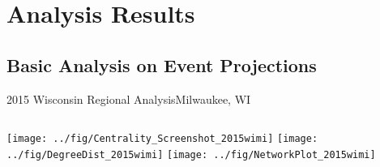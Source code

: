 \documentclass[10pt]{beamer}
\begin{document}

\section{Analysis Results}
\subsection{Basic Analysis on Event Projections}
\begin{frame}{2015 Wisconsin Regional Analysis}{Milwaukee, WI}
	\begin{columns}
		\texttt{[image: ../fig/Centrality\_Screenshot\_2015wimi]}
		\texttt{[image: ../fig/DegreeDist\_2015wimi]}
		\texttt{[image: ../fig/NetworkPlot\_2015wimi]}
	\end{columns}
\end{frame}
\end{document}
